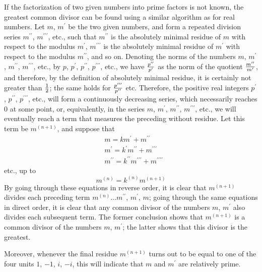 \documentclass[twoside,12pt]{memoir}
\let\oldfrac\frac
\def\frac#1#2{\mathchoice{\tfrac{#1}{#2}}{\oldfrac{#1}{#2}}{\genfrac{}{}{}{2}{#1}{#2\mathstrut}}{\genfrac{}{}{}{3}{#1}{#2\mathstrut}}}
\begin{document}
If the factorization of two given numbers into prime factors is not known, the greatest common divisor can be found using a similar algorithm as for real numbers. Let \(m\), \(m^{\prime}\) be the two given numbers, and form a repeated division series \(m^{\prime \prime}\), \(m^{\prime \prime \prime}\), etc., such that \(m^{\prime \prime}\) is the absolutely minimal residue of \(m\) with respect to the modulus \(m^{\prime}\), \(m^{\prime \prime \prime}\) is the absolutely minimal residue of \(m^{\prime}\) with respect to the modulus \(m^{\prime \prime}\), and so on. Denoting the norms of the numbers \(m\), \(m^{\prime}\), \(m^{\prime \prime}\), \(m^{\prime \prime \prime}\), etc., by \(p\), \(p^{\prime}\), \(p^{\prime \prime}\), \(p^{\prime \prime \prime}\), etc., we have \(\frac{p^{\prime \prime}}{p^{\prime}}\) as the norm of the quotient \(\frac{m^{\prime \prime}}{m^{\prime}}\), and therefore, by the definition of absolutely minimal residue, it is certainly not greater than \(\frac{1}{2}\); the same holds for \(\frac{p^{\prime \prime \prime}}{p^{\prime \prime}}\) etc. Therefore, the positive real integers \(p^{\prime}\), \(p^{\prime \prime}\), \(p^{\prime \prime \prime}\), etc., will form a continuously decreasing series, which necessarily reaches \(0\) at some point, or, equivalently, in the series \(m\), \(m^{\prime}\), \(m^{\prime \prime}\), \(m^{\prime \prime \prime}\), etc., we will eventually reach a term that measures the preceding without residue. Let this term be \(m^{(n+1)}\), and suppose that
\[\begin{aligned}
& m=k m^{\prime}+m^{\prime \prime} \\
& m^{\prime}=k^{\prime} m^{\prime \prime}+m^{\prime \prime \prime} \\
& m^{\prime \prime}=k^{\prime \prime} m^{\prime \prime \prime}+m^{\prime \prime \prime \prime}
\end{aligned}\]
etc., up to
\[m^{(n)}=k^{(n)} m^{(n+1)}\]
By going through these equations in reverse order, it is clear that \(m^{(n+1)}\) divides each preceding term \(m^{(n)} \ldots m^{\prime \prime}\), \(m^{\prime}\), \(m\); going through the same equations in direct order, it is clear that any common divisor of the numbers \(m\), \(m^{\prime}\) also divides each subsequent term. The former conclusion shows that \(m^{(n+1)}\) is a common divisor of the numbers \(m\), \(m^{\prime}\); the latter shows that this divisor is the greatest.

Moreover, whenever the final residue \(m^{(n+1)}\) turns out to be equal to one of the four units \(1\), \(-1\), \(i\), \(-i\), this will indicate that \(m\) and \(m^{\prime}\) are relatively prime.
\end{document}
